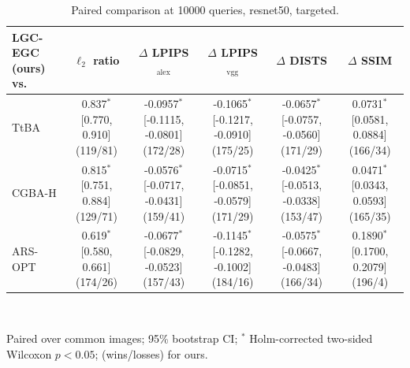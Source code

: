 \begin{table}[t]
\centering\footnotesize
\caption{Paired comparison at 10000 queries, resnet50, targeted.}
\begin{tabular}{lccccc}
\toprule
LGC-EGC (ours) vs. & $\ell_2$ ratio & $\Delta$ LPIPS$_{\mathrm{alex}}$ & $\Delta$ LPIPS$_{\mathrm{vgg}}$ & $\Delta$ DISTS & $\Delta$ SSIM \\
\midrule
TtBA & 0.837$^{*}$ [0.770, 0.910] (119/81) & -0.0957$^{*}$ [-0.1115, -0.0801] (172/28) & -0.1065$^{*}$ [-0.1217, -0.0910] (175/25) & -0.0657$^{*}$ [-0.0757, -0.0560] (171/29) & 0.0731$^{*}$ [0.0581, 0.0884] (166/34) \\
CGBA-H & 0.815$^{*}$ [0.751, 0.884] (129/71) & -0.0576$^{*}$ [-0.0717, -0.0431] (159/41) & -0.0715$^{*}$ [-0.0851, -0.0579] (171/29) & -0.0425$^{*}$ [-0.0513, -0.0338] (153/47) & 0.0471$^{*}$ [0.0343, 0.0593] (165/35) \\
ARS-OPT & 0.619$^{*}$ [0.580, 0.661] (174/26) & -0.0677$^{*}$ [-0.0829, -0.0523] (157/43) & -0.1145$^{*}$ [-0.1282, -0.1002] (184/16) & -0.0575$^{*}$ [-0.0667, -0.0483] (166/34) & 0.1890$^{*}$ [0.1700, 0.2079] (196/4) \\
\bottomrule
\end{tabular}
\\[2pt]\parbox{\linewidth}{\scriptsize Paired over common images; 95\% bootstrap CI; $^{*}$ Holm-corrected two-sided Wilcoxon $p<0.05$; (wins/losses) for ours.}
\end{table}
